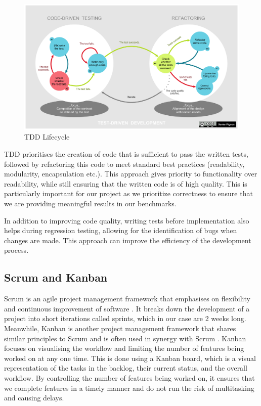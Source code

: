 \begin{figure}[h]
    \centering
    \includegraphics[width=\linewidth]{../assets/TDD_Global_Lifecycle.png}
    \caption{TDD Lifecycle \cite{Wikimedia:TDD}}
    \label{fig:tdd}
\end{figure}

TDD prioritises the creation of code that is sufficient to pass the written 
tests, followed by refactoring this code to meet standard best practices (readability, modularity, encapsulation etc.). This approach gives priority to functionality over readability, while still ensuring that the written code is of high quality. This is particularly important for our project as we prioritize correctness to ensure that we are providing meaningful results in our benchmarks.

In addition to improving code quality, writing tests before implementation also helps during regression testing, allowing for the identification of bugs when changes are made. This approach can improve the efficiency of the development process.


\subsection{Scrum and Kanban} Scrum is an agile project management framework that emphasises on 
flexibility and continuous improvement of software \cite{scrumguide}. 
It breaks down the development of a project 
into short iterations called sprints, which in our case are 2 weeks long. Meanwhile, Kanban is  
another project management framework that shares similar principles to Scrum and is often used 
in synergy with Scrum \cite{kanbanscrum}. Kanban focuses on visualising the workflow and 
limiting the number of features being worked on at any one time. This is done using a Kanban 
board, which is a visual representation of the tasks in the backlog, their current status, and 
the overall workflow. 
By controlling the number of features being worked on, 
it ensures that we complete features in a timely manner and do not run the risk of multitasking 
and causing delays. 

